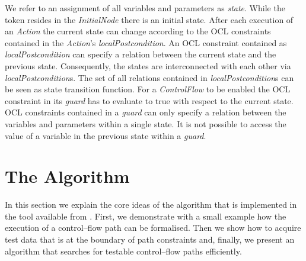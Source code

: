 \documentclass[runningheads,a4paper]{llncs}%
\newcommand{\UMLType}[1]{\textsf{\textit{#1}}} %
\newcommand{\UMLReference}[1]{\textsf{\textit{#1}}} %
\begin{document}
We refer to an assignment of all variables and parameters as \emph{state}. While the token resides in the \UMLType{InitialNode} there is an initial state. After each execution of an \UMLType{Action} the current state can change according to the OCL constraints contained in the \UMLType{Action}'s \UMLReference{localPostcondition}. An OCL constraint contained as \UMLType{localPostcondition} can specify a relation between the current state and the previous state. Consequently, the states are interconnected with each other via \UMLReference{localPostcondition}s. The set of all relations contained in \UMLType{localPostcondition}s can be seen as state transition function. For a \UMLType{ControlFlow} to be enabled the OCL constraint in its \UMLReference{guard} has to evaluate to true with respect to the current state. OCL constraints contained in a \UMLReference{guard} can only specify a relation between the variables and parameters within a single state. It is not possible to access the value of a variable in the previous state within a \UMLReference{guard}.%
\section{The Algorithm}%
\label{sec:Algorithm}%
In this section we explain the core ideas of the algorithm that is implemented in the tool available from \cite{PartegWebsite}. First, we demonstrate with a small example how the execution of a control--flow path can be formalised. Then we show how to acquire test data that is at the boundary of path constraints and, finally, we present an algorithm that searches for testable control--flow paths efficiently.%
\end{document}
